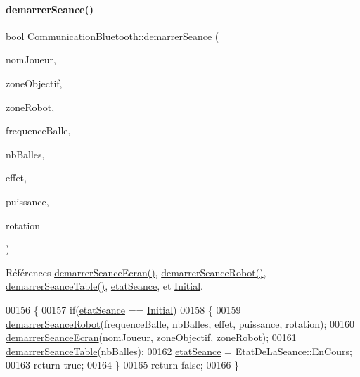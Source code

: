 \paragraph{\texorpdfstring{demarrer\+Seance()}{demarrerSeance()}}
{\footnotesize\ttfamily bool Communication\+Bluetooth\+::demarrer\+Seance (\begin{DoxyParamCaption}\item[{Q\+String}]{nom\+Joueur,  }\item[{Q\+String}]{zone\+Objectif,  }\item[{Q\+String}]{zone\+Robot,  }\item[{int}]{frequence\+Balle,  }\item[{int}]{nb\+Balles,  }\item[{int}]{effet,  }\item[{int}]{puissance,  }\item[{bool}]{rotation }\end{DoxyParamCaption})}



Références \hyperlink{class_communication_bluetooth_a024493f537e8501a813e1555716cf7ad}{demarrer\+Seance\+Ecran()}, \hyperlink{class_communication_bluetooth_a02e74da6910804557f31e81f26201f89}{demarrer\+Seance\+Robot()}, \hyperlink{class_communication_bluetooth_abb71c8f555c64d1791d330955ace417c}{demarrer\+Seance\+Table()}, \hyperlink{class_communication_bluetooth_adc66f3034d46f3964a26b62ad98e784f}{etat\+Seance}, et \hyperlink{class_communication_bluetooth_a414353c68cf4b316937d7c929f20d22aa487b75f166d1b0c9b3f47fab1692c024}{Initial}.


\begin{DoxyCode}
00156 \{
00157     \textcolor{keywordflow}{if}(\hyperlink{class_communication_bluetooth_adc66f3034d46f3964a26b62ad98e784f}{etatSeance} == \hyperlink{class_communication_bluetooth_a414353c68cf4b316937d7c929f20d22aa487b75f166d1b0c9b3f47fab1692c024}{Initial})
00158     \{
00159         \hyperlink{class_communication_bluetooth_a02e74da6910804557f31e81f26201f89}{demarrerSeanceRobot}(frequenceBalle, nbBalles, effet, puissance, rotation);
00160         \hyperlink{class_communication_bluetooth_a024493f537e8501a813e1555716cf7ad}{demarrerSeanceEcran}(nomJoueur, zoneObjectif, zoneRobot);
00161         \hyperlink{class_communication_bluetooth_abb71c8f555c64d1791d330955ace417c}{demarrerSeanceTable}(nbBalles);
00162         \hyperlink{class_communication_bluetooth_adc66f3034d46f3964a26b62ad98e784f}{etatSeance} = EtatDeLaSeance::EnCours;
00163         \textcolor{keywordflow}{return} \textcolor{keyword}{true};
00164     \}
00165     \textcolor{keywordflow}{return} \textcolor{keyword}{false};
00166 \}
\end{DoxyCode}
\mbox{\label{class_communication_bluetooth_a024493f537e8501a813e1555716cf7ad}} 

